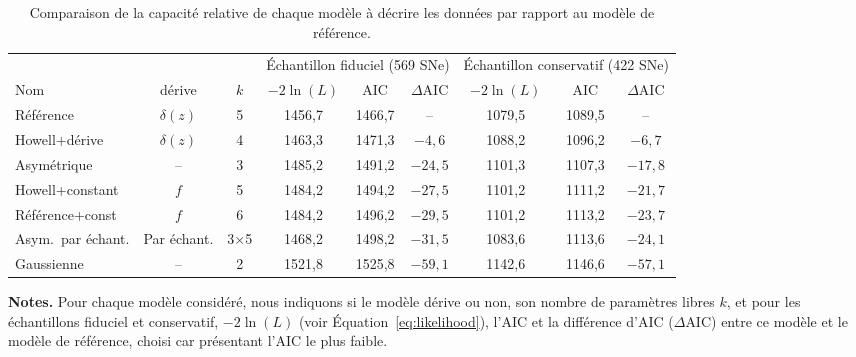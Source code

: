 \documentclass[../main/main.tex]{subfiles}
\begin{document}
\begin{table}[ht]
    \centerfloat
    \begin{threeparttable}
        \caption[Comparaison de la capacité relative de chaque modèle à décrire
        les données par rapport au modèle de référence]{Comparaison de la
            capacité relative de chaque modèle à décrire les données par rapport
        au modèle de référence.}\label{tab:comp}
        \begin{tabular}{lcccccccc}
            \toprule
            & & & \multicolumn{3}{c}{Échantillon fiduciel (569 SNe)}
                & \multicolumn{3}{c}{Échantillon conservatif (422 SNe)} \\
            \cmidrule(lr){4-6} \cmidrule(lr){7-9}
            Nom & dérive & $k$ &
            $-2\ln(L)$ & AIC & $\Delta$AIC & $-2\ln(L)$ & AIC & $\Delta$AIC\\
            \midrule
            Référence & $\delta(z)$ & 5
            & 1456,7 & 1466,7 & -- 
            & 1079,5 & 1089,5 & -- \\
            Howell+dérive & $\delta(z)$ & 4
            & 1463,3 & 1471,3 & $-4,6$
            & 1088,2 & 1096,2 & $-6,7$ 
            \\
            Asymétrique & -- & 3
            & 1485,2 & 1491,2 & $-24,5$
            & 1101,3 & 1107,3 & $-17,8$ 
            \\
            Howell+constant & $f$ & 5
            & 1484,2 & 1494,2 & $-27,5$
            & 1101,2 & 1111,2 & $-21,7$ 
            \\
            Référence+const & $f$ & 6
            & 1484,2 & 1496,2 & $-29,5$
            & 1101,2 & 1113,2 & $-23,7$ 
            \\
            Asym.\ par échant. & Par échant. & 3$\times$5
            & 1468,2 & 1498,2  & $-31,5$
            & 1083,6 & 1113,6  & $-24,1$ 
            \\
            Gaussienne & -- & 2
            & 1521,8 & 1525,8 & $-59,1$
            & 1142,6 & 1146,6 & $-57,1$ 
            \\
            \bottomrule
        \end{tabular}
        \begin{tablenotes}[flushleft]
            \item \textbf{\hspace{-3.2pt}Notes.} Pour chaque modèle considéré,
                nous indiquons si le modèle dérive ou non, son nombre de
                paramètres libres $k$, et pour les échantillons fiduciel et
                conservatif, $-2\ln(L)$ (voir Équation~\ref{eq:likelihood}),
                l'AIC et la différence d'AIC ($\Delta$AIC) entre ce modèle et le
                modèle de référence, choisi car présentant l'AIC le plus faible.
        \end{tablenotes}
    \end{threeparttable}
\end{table}
\end{document}
